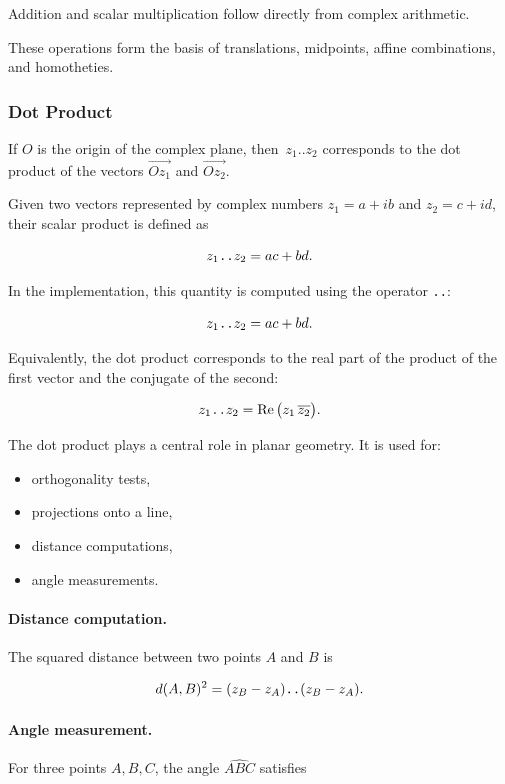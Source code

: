 Addition and scalar multiplication follow directly
from complex arithmetic.

These operations form the basis of translations,
midpoints, affine combinations, and homotheties.


\subsubsection{Dot Product}
If \(O\) is the origin of the complex plane, then \(\,z_1 .. z_2\) corresponds to the dot product of the vectors \(\overrightarrow{Oz_1}\) and \(\overrightarrow{Oz_2}\).


Given two vectors represented by complex numbers
\(z_1 = a+ib\) and \(z_2 = c+id\),
their scalar product is defined as

\[
z_1 \verb|..| z_2 = ac + bd.
\]

In the implementation, this quantity is computed
using the operator \verb|..|:

\[
z_1 \verb|..| z_2 = ac + bd.
\]

Equivalently, the dot product corresponds to the real part of
the product of the first vector and the conjugate of the second:

\[
z_1 \verb|..| z_2
=
\operatorname{Re}\big(z_1 \,\overline{z_2}\big).
\]

\medskip
The dot product plays a central role in planar geometry.
It is used for:

\begin{itemize}
\item orthogonality tests,
\item projections onto a line,
\item distance computations,
\item angle measurements.
\end{itemize}

\paragraph{Distance computation.}

The squared distance between two points \(A\) and \(B\) is

\[
d(A,B)^2 =
(z_B - z_A) \verb|..|(z_B - z_A).
\]

\paragraph{Angle measurement.}

For three points \(A,B,C\), the angle \(\widehat{ABC}\) satisfies


